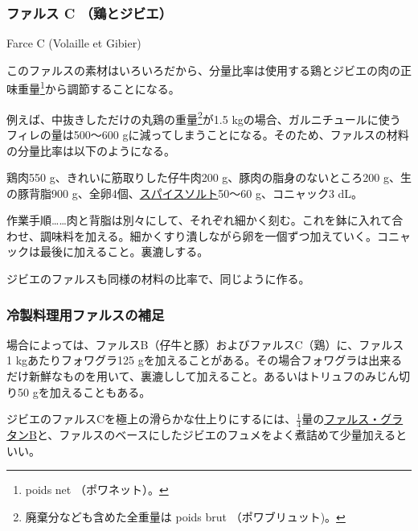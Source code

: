 \begin{recette}
\atoaki{}

\hypertarget{farce-froide-c}{%
\subsubsection{ファルス C （鶏とジビエ）}\label{farce-froide-c}}

\begin{frsubenv}

Farce C (Volaille et Gibier)

\end{frsubenv}


このファルスの素材はいろいろだから、分量比率は使用する鶏とジビエの肉の正味重量\footnote{poids
  net （ポワネット）。}から調節することになる。

例えば、中抜きしただけの丸鶏の重量\footnote{廃棄分なども含めた全重量は
  poids brut （ポワブリュット)。}が1.5
kgの場合、ガルニチュールに使うフィレの量は500〜600
gに減ってしまうことになる。そのため、ファルスの材料の分量比率は以下のようになる。

鶏肉550 g、きれいに筋取りした仔牛肉200 g、豚肉の脂身のないところ200
g、生の豚背脂900
g、全卵4個、\protect\hyperlink{sel-epice}{スパイスソルト}50〜60
g、コニャック3 dL。

作業手順\ldots{}\ldots{}肉と背脂は別々にして、それぞれ細かく刻む。これを鉢に入れて合わせ、調味料を加える。細かくすり潰しながら卵を一個ずつ加えていく。コニャックは最後に加えること。裏漉しする。

ジビエのファルスも同様の材料の比率で、同じように作る。

\atoaki{}

\hypertarget{observation-sur-les-farces}{%
\subsubsection{冷製料理用ファルスの補足}\label{observation-sur-les-farces}}

場合によっては、ファルスB（仔牛と豚）およびファルスC（鶏）に、ファルス 1
kgあたりフォワグラ125
gを加えることがある。その場合フォワグラは出来るだけ新鮮なものを用いて、裏漉しして加えること。あるいはトリュフのみじん切り50
gを加えることもある。

ジビエのファルスCを極上の滑らかな仕上りにするには、\(\frac{1}{4}\)量の\protect\hyperlink{farce-gratin-b}{ファルス・グラタンB}と、ファルスのベースにしたジビエのフュメをよく煮詰めて少量加えるといい。

\end{recette}

